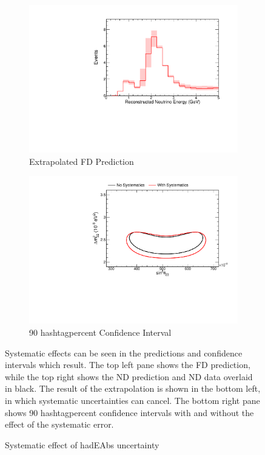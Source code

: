 {\begin{figure}
\begin{center}
\begin{subfigure}[c]{0.49\textwidth}
\includegraphics[width=\textwidth]{figures/systs/prediction/fd_extrap_prediction_hadEAbs.pdf}
\caption*{Extrapolated FD Prediction}
\end{subfigure}
\begin{subfigure}[c]{0.49\textwidth}
\includegraphics[width=\textwidth]{figures/systs/prediction/fd_extrap_contour_hadEAbs.pdf}
\caption*{90 hashtagpercent Confidence Interval}
\end{subfigure}
\end{center}
\caption{Systematic effect of hadEAbs uncertainty}{
Systematic effects can be seen in the predictions and confidence intervals
which result.
The top left pane shows the FD prediction, while the top right shows the
ND prediction and ND data overlaid in black.
The result of the extrapolation is shown in the bottom left, in which
systematic uncertainties can cancel.
The bottom right pane shows 90 hashtagpercent confidence intervals with and without
the effect of the systematic error.}
\label{syst_fig_hadEAbs}


\end{figure}}
